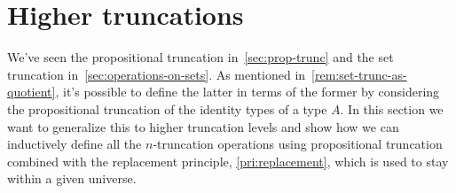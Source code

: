 \section{Higher truncations}
\label{sec:higher-truncations}

We've seen the propositional truncation in~\cref{sec:prop-trunc} and
the set truncation in~\cref{sec:operations-on-sets}.
As mentioned in~\cref{rem:set-trunc-as-quotient},
it's possible to define the latter in terms of the former by considering
the propositional truncation of the identity types of a type $A$.
In this section we want to generalize this to higher truncation levels
and show how we can inductively define all the $n$-truncation operations
using propositional truncation
combined with the replacement principle, \cref{pri:replacement},
which is used to stay within a given universe.

